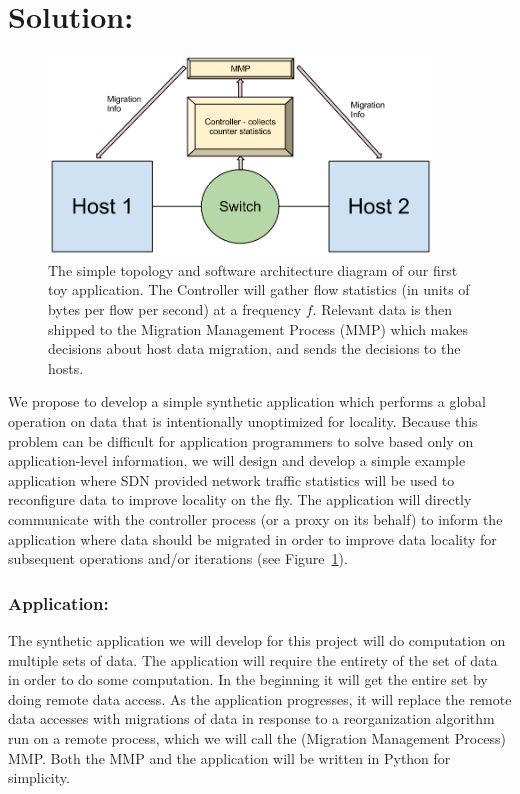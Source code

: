 \documentclass[12pt]{article} \usepackage{graphicx} \usepackage{amsmath}
\begin{document}
\section*{Solution:} \label{solution} 
\begin{figure}[t]
  \centerline{\includegraphics[width=4.0in]{img/toy_arch.png}} 
  \caption{
  The simple topology and software architecture diagram of our first toy
  application.  The Controller will gather flow statistics (in units of bytes
  per flow per second) at a frequency $f$. Relevant data is then shipped to the
  Migration Management Process (MMP) which makes decisions about host data
  migration, and sends the decisions to the hosts.} 
  \label{fig:toy_arch} 
\end{figure} 
We propose to develop a simple synthetic application which performs a global
operation on data that is intentionally unoptimized for locality.  Because this
problem can be difficult for application programmers to solve based only on
application-level information, we will design and develop a simple
example application where SDN provided network traffic statistics will be used
to reconfigure data to improve locality on the fly.  The application will
directly communicate with the controller process (or a proxy on its behalf) to
inform the application where data should be migrated in order to improve data
locality for subsequent operations and/or iterations (see
Figure~\ref{fig:toy_arch}).

\subsubsection*{Application:} \label{application} The synthetic application we
will develop for this project will do computation on multiple sets of data.
The application will require the entirety of the set of data in order to do
some computation.  In the beginning it will get the entire set by doing remote
data access.  As the application progresses, it will replace the remote data
accesses with migrations of data in response to a reorganization algorithm run
on a remote process, which we will call the (Migration Management Process) MMP.
Both the MMP and the application will be written in Python for simplicity.
\end{document}
